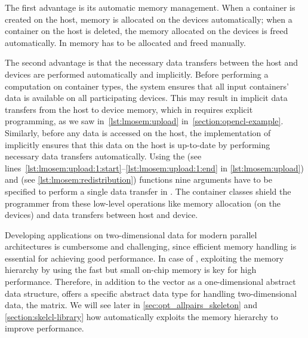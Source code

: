 The first advantage is its automatic memory management.
When a container is created on the host, memory is allocated on the devices automatically;
when a container on the host is deleted, the memory allocated on the devices is freed automatically.
In \OpenCL memory has to be allocated and freed manually.

The second advantage is that the necessary data transfers between the host and devices are performed automatically and implicitly.
Before performing a computation on container types, the \SkelCL system ensures that all input containers' data is available on all participating devices.
This may result in implicit data transfers from the host to device memory, which in \OpenCL requires explicit programming, as we saw in~\autoref{lst:lmosem:upload} in~\autoref{section:opencl-example}.
Similarly, before any data is accessed on the host, the implementation of \SkelCL implicitly ensures that this data on the host is up-to-date by performing necessary data transfers automatically.
Using the  (see lines~\ref{lst:lmosem:upload:1:start}--\ref{lst:lmosem:upload:1:end} in \autoref{lst:lmosem:upload}) and  (see \autoref{lst:lmosem:redistribution}) functions nine arguments have to be specified to perform a single data transfer in \OpenCL.
The \SkelCL container classes shield the programmer from these low-level operations like memory allocation (on the devices) and data transfers between host and device.

Developing applications on two-dimensional data for modern parallel architectures is cumbersome and challenging, since efficient memory handling is essential for achieving good performance.
In case of \GPUs, exploiting the memory hierarchy by using the fast but small on-chip memory is key for high performance.
Therefore, in addition to the vector as a one-dimensional abstract data structure, \SkelCL offers a specific abstract data type for handling two-dimensional data, the matrix.
We will see later in \autoref{sec:opt_allpairs_skeleton} and \autoref{section:skelcl-library} how \SkelCL automatically exploits the memory hierarchy to improve performance.



